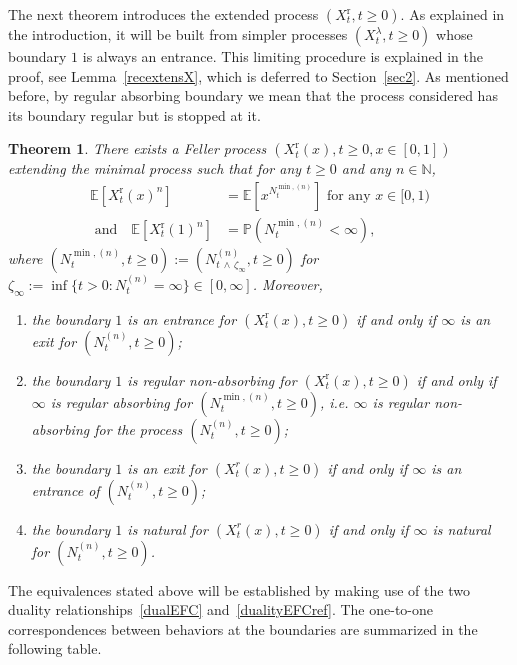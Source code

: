 \documentclass[10pt]{amsart}
\newtheorem{theo}{Theorem}[section]
\theoremstyle{definition}\newtheorem{defi}[theo]{Definition}\newtheorem{rema}[theo]{Remark}\newtheorem{exam}[theo]{Example}\newtheorem{exem}[theo]{Example}\newtheorem{nota}[theo]{Notation}
\newcommand{\rmr}{\mathrm{r}}
\newcommand{\bbN}{\mathbb{N}}
\newcommand{\bbE}{\mathbb{E}}
\newcommand{\bbP}{\mathbb{P}}
\newcommand*{\romanenumi}{\renewcommand*{\theenumi}{\roman{enumi}}}
\begin{document}
The next theorem introduces the extended process $(X_t^{\rmr},t\geq 0)$. As explained in the introduction, it will be built from simpler processes $(X_t^{\lambda},t\geq 0)$ whose boundary $1$ is always an entrance. This limiting procedure is explained in the proof, see Lemma~\ref{recextensX}, which is deferred to Section~\ref{sec2}. As mentioned before, by regular absorbing boundary we mean that the process considered has its boundary regular but is stopped at it.


\begin{theo}\label{thmmomentduality2}
There exists a Feller process $(X_t^{\rmr}(x),t\geq 0, x\in [0,1])$ extending the minimal process such that for any $t\geq 0$ and any $n\in \bbN$,
\begin{equation}\label{dualityEFCref}
\begin{split}
\bbE\left[X^{\rmr}_t(x)^n\right] &=\bbE\left[x^{N^{\min,(n)}_t}\right] \text{ for any } x\in [0,1) \\
\text{ and}\quad \bbE\left[X^{\rmr}_t(1)^n\right] &=\bbP\left(N^{\min,(n)}_t<\infty\right),
\end{split}
\end{equation}
where $(N^{\min,(n)}_t,t\geq 0):=(N_{t\,\wedge\, \zeta_{\infty}}^{(n)},t\geq 0)$ for $\zeta_{\infty}:=\inf\{t>0: N_t^{(n)}=\infty\}\in [0,\infty]$. Moreover,
\begin{enumerate}\romanenumi
\item\label{theo2.7.i} the boundary $1$ is an entrance for $(X^{\rmr}_t(x),t\geq 0)$ if and only if $\infty$ is an exit for $(N^{(n)}_t,t\geq 0)$;
\item\label{theo2.7.ii} the boundary $1$ is regular non-absorbing for $(X^{\rmr}_t(x),t\geq 0)$ if and only if $\infty$ is regular absorbing for $(N^{\min,(n)}_t,t\geq 0)$, i.e. $\infty$ is regular non-absorbing for the process $(N^{(n)}_t,t\geq 0)$;
\item\label{theo2.7.iii} the boundary $1$ is an exit for $(X^{r}_t(x),t\geq 0)$ if and only if $\infty$ is an entrance of $(N^{(n)}_t,t\geq 0)$;
\item\label{theo2.7.iv} the boundary $1$ is natural for $(X^{r}_t(x),t\geq 0)$ if and only if $\infty$ is natural for $(N^{(n)}_t,t\geq 0)$.
\end{enumerate}
\end{theo}


The equivalences stated above will be established by making use of the two duality relationships~\eqref{dualEFC} and~\eqref{dualityEFCref}. The one-to-one correspondences between behaviors at the boundaries are summarized in the following table.
\end{document}
